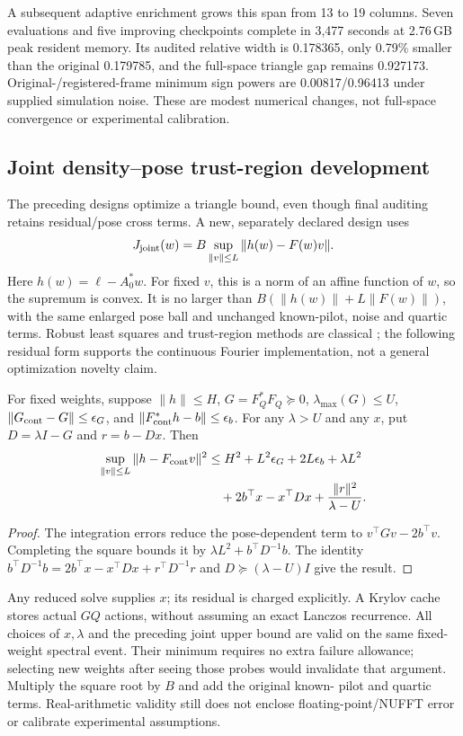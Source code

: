 A subsequent adaptive enrichment grows this span from 13 to 19 columns.
Seven evaluations and five improving checkpoints complete in 3,477 seconds
at 2.76\,GB peak resident memory. Its audited relative width is 0.178365,
only 0.79\% smaller than the original 0.179785, and the full-space triangle
gap remains 0.927173. Original-/registered-frame minimum sign powers are
0.00817/0.96413 under supplied simulation noise. These are modest numerical
changes, not full-space convergence or experimental calibration.

\subsection{Joint density--pose trust-region development}
\label{sec:jointtrust}
The preceding designs optimize a triangle bound, even though final auditing
retains residual/pose cross terms. A new, separately declared design uses
\[
 J_{\rm joint}(w)=B\sup_{\|v\|\le L}\|h(w)-F(w)v\|.
\]
Here $h(w)=\ell-A_0^*w$. For fixed $v$, this is a norm of an affine function of $w$, so the supremum
is convex. It is no larger than $B(\|h(w)\|+L\|F(w)\|)$, with the same
enlarged pose ball and unchanged known-pilot, noise and quartic terms.
Robust least squares and trust-region methods are classical
\citep{elghaoui1997,adachi2017}; the following residual form supports the
continuous Fourier implementation, not a general optimization novelty claim.

\begin{samepage}
\begin{proposition}
For fixed weights, suppose $\|h\|\le H$, $G=F_Q^*F_Q\succeq0$,
$\lambda_{\max}(G)\le U$, $\|G_{\rm cont}-G\|\le\epsilon_G$, and
$\|F_{\rm cont}^*h-b\|\le\epsilon_b$. For any $\lambda>U$ and any $x$, put
$D=\lambda I-G$ and $r=b-Dx$. Then
\[
\begin{aligned}
 \sup_{\|v\|\le L}\|h-F_{\rm cont}v\|^2
 &\le H^2+L^2\epsilon_G+2L\epsilon_b+\lambda L^2\\
 &\quad+2b^\top x-x^\top Dx+\frac{\|r\|^2}{\lambda-U}.
\end{aligned}
\]
\end{proposition}
\end{samepage}
\begin{proof}
The integration errors reduce the pose-dependent term to
$v^\top Gv-2b^\top v$. Completing the square bounds it by
$\lambda L^2+b^\top D^{-1}b$. The identity
$b^\top D^{-1}b=2b^\top x-x^\top Dx+r^\top D^{-1}r$ and
$D\succeq(\lambda-U)I$ give the result.
\end{proof}
Any reduced solve supplies $x$; its residual is charged explicitly. A Krylov
cache stores actual $GQ$ actions, without assuming an exact Lanczos recurrence.
All choices of $x,\lambda$ and the preceding joint upper bound are valid on
the same fixed-weight spectral event. Their minimum requires no extra failure
allowance; selecting new weights after seeing those probes would invalidate
that argument. Multiply the square root by $B$ and add the original known-
pilot and quartic terms. Real-arithmetic validity still does not enclose
floating-point/NUFFT error or calibrate experimental assumptions.

